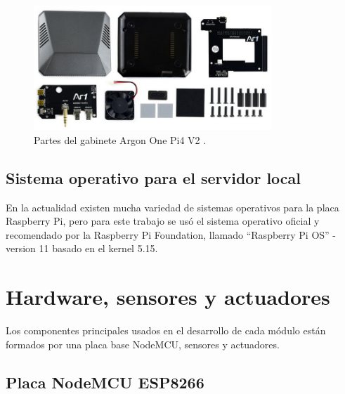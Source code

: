 \begin{figure}[htpb]
\centering 
\includegraphics[width=0.8\textwidth]{./Figures/argon2.jpg}
\caption{Partes del gabinete Argon One Pi4 V2 \protect\footnotemark.}
\label{fig:armado}
\end{figure}

\subsection{Sistema operativo para el servidor local}

En la actualidad existen mucha variedad de sistemas operativos para la placa Raspberry Pi, pero para este trabajo se usó el sistema operativo oficial y recomendado por la Raspberry Pi Foundation, llamado ``Raspberry Pi OS'' - version 11 basado en el kernel 5.15.



\section{Hardware, sensores y actuadores}

Los componentes principales usados en el desarrollo de cada módulo están formados por una placa base NodeMCU, sensores y actuadores.

\subsection{Placa NodeMCU ESP8266}


